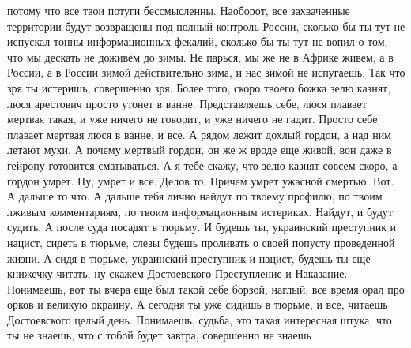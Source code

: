 потому что все твои потуги бессмысленны. Наоборот, все захваченные территории
будут возвращены под полный контроль России, сколько бы ты тут не испускал
тонны информационных фекалий, сколько бы ты тут не вопил о том, что мы дескать
не доживём до зимы. Не парься, мы же не в Африке живем, а в России, а в России
зимой действительно зима, и нас зимой не испугаешь. Так что зря ты истеришь,
совершенно зря. Более того, скоро твоего божка зелю казнят, люся арестович
просто утонет в ванне. Представляешь себе, люся плавает мертвая такая, и уже
ничего не говорит, и уже ничего не гадит. Просто себе плавает мертвая люся в
ванне, и все. А рядом лежит дохлый гордон, а над ним летают мухи. А почему
мертвый гордон, он же ж вроде еще живой, вон даже в гейропу готовится
сматываться. А я тебе скажу, что зелю казнят совсем скоро, а гордон умрет. Ну,
умрет и все. Делов то. Причем умрет ужасной смертью. Вот. А дальше то что. А
дальше тебя лично найдут по твоему профилю, по твоим лживым комментариям, по
твоим информационным истериках. Найдут, и будут судить. А после суда посадят в
тюрьму. И будешь ты, украинский преступник и нацист, сидеть в тюрьме, слезы
будешь проливать о своей попусту проведенной жизни. А сидя в тюрьме, украинский
преступник и нацист, будешь ты еще книжечку читать, ну скажем Достоевского
Преступление и Наказание. Понимаешь, вот ты вчера еще был такой себе борзой,
наглый, все время орал про орков и великую окраину. А сегодня ты уже сидишь в
тюрьме, и все, читаешь Достоевского целый день. Понимаешь, судьба, это такая
интересная штука, что ты не знаешь, что с тобой будет завтра, совершенно не
знаешь
